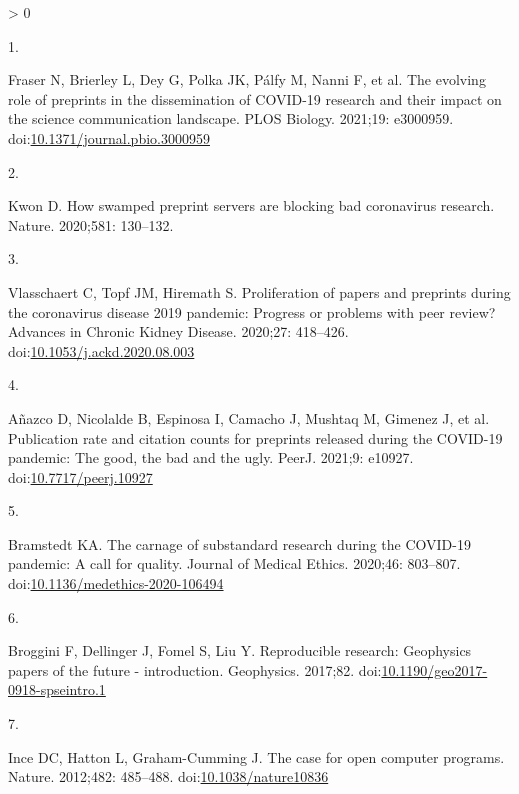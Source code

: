\documentclass[10pt,letterpaper]{article}
\newlength{\csllabelwidth}
\newlength{\cslhangindent}
\newenvironment{CSLReferences}[3] %
 {%
  \setlength{\parindent}{0pt}
  \ifodd #1 \everypar{\setlength{\hangindent}{\cslhangindent}}\ignorespaces\fi
  \ifnum #2 > 0
  \setlength{\parskip}{#2\baselineskip}
  \fi
 }%
 {}
\newcommand{\CSLLeftMargin}[1]{\parbox[t]{\csllabelwidth}{#1}}
\newcommand{\CSLRightInline}[1]{\parbox[t]{\linewidth - \csllabelwidth}{#1}}
\begin{document}
\hypertarget{refs}{}
\begin{CSLReferences}{0}{0}
\leavevmode\hypertarget{ref-Fraser2021evolving}{}%
\CSLLeftMargin{1. }
\CSLRightInline{Fraser N, Brierley L, Dey G, Polka JK, Pálfy M, Nanni F,
et al. The evolving role of preprints in the dissemination of COVID-19
research and their impact on the science communication landscape. PLOS
Biology. 2021;19: e3000959.
doi:\href{https://doi.org/10.1371/journal.pbio.3000959}{10.1371/journal.pbio.3000959}}

\leavevmode\hypertarget{ref-Kwon2021swamped}{}%
\CSLLeftMargin{2. }
\CSLRightInline{Kwon D. How swamped preprint servers are blocking bad
coronavirus research. Nature. 2020;581: 130--132. }

\leavevmode\hypertarget{ref-Vlasschaert2020proliferation}{}%
\CSLLeftMargin{3. }
\CSLRightInline{Vlasschaert C, Topf JM, Hiremath S. Proliferation of
papers and preprints during the coronavirus disease 2019 pandemic:
Progress or problems with peer review? Advances in Chronic Kidney
Disease. 2020;27: 418--426.
doi:\href{https://doi.org/10.1053/j.ackd.2020.08.003}{10.1053/j.ackd.2020.08.003}}

\leavevmode\hypertarget{ref-Anazco2021publication}{}%
\CSLLeftMargin{4. }
\CSLRightInline{Añazco D, Nicolalde B, Espinosa I, Camacho J, Mushtaq M,
Gimenez J, et al. Publication rate and citation counts for preprints
released during the COVID-19 pandemic: The good, the bad and the ugly.
PeerJ. 2021;9: e10927.
doi:\href{https://doi.org/10.7717/peerj.10927}{10.7717/peerj.10927}}

\leavevmode\hypertarget{ref-Bramstedt2020carnage}{}%
\CSLLeftMargin{5. }
\CSLRightInline{Bramstedt KA. The carnage of substandard research during
the COVID-19 pandemic: A call for quality. Journal of Medical Ethics.
2020;46: 803--807.
doi:\href{https://doi.org/10.1136/medethics-2020-106494}{10.1136/medethics-2020-106494}}

\leavevmode\hypertarget{ref-Broggini2017reproducible}{}%
\CSLLeftMargin{6. }
\CSLRightInline{Broggini F, Dellinger J, Fomel S, Liu Y. Reproducible
research: Geophysics papers of the future - introduction. Geophysics.
2017;82.
doi:\href{https://doi.org/10.1190/geo2017-0918-spseintro.1}{10.1190/geo2017-0918-spseintro.1}}

\leavevmode\hypertarget{ref-Ince2012case}{}%
\CSLLeftMargin{7. }
\CSLRightInline{Ince DC, Hatton L, Graham-Cumming J. The case for open
computer programs. Nature. 2012;482: 485--488.
doi:\href{https://doi.org/10.1038/nature10836}{10.1038/nature10836}}


\end{CSLReferences}
\end{document}
